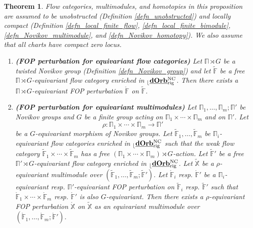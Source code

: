 \documentclass[reqno, 10pt]{amsart}
\numberwithin{equation}{section}
\numberwithin{equation}{section}
\newtheorem{thma}{Theorem}
\theoremstyle{definition}
\theoremstyle{remark}
\newcommand{\beqn}{\begin{equation*}}
\newcommand{\eeqn}{\end{equation*}}
\newcommand{\mb}{\mathbb}
\renewcommand{\outer}{{}_{\lfloor}}
\newcommand{\uds}[1]{\underline{\smash{#1}}}
\begin{document}
\begin{thma}\label{thma_FOP} 
Flow categories, multimodules, and homotopies in this proposition are assumed to be unobstructed (Definition \ref{defn_unobstructed}) and locally compact (Definition \ref{defn_local_finite_flow}, \ref{defn_local_finite_bimodule}, \ref{defn_Novikov_multimodule}, and \ref{defn_Novikov_homotopy}). We also assume that all charts have compact zero locus.
\begin{enumerate}

\item {\bf (FOP perturbation for equivariant flow categories)} Let $\mb\Pi \rtimes G$ be a twisted Novikov group (Definition \ref{defn_Novikov_group}) and let $\tilde {\mb F}$ be a free $\mb\Pi \rtimes G$-equivariant flow category enriched in $\outer \uds{\bf dOrb}_{\rm rig}^{\rm NC}$. Then there exists a $\mb\Pi\rtimes G$-equivariant FOP perturbation $\mathring {\mb F}$ on $\tilde {\mb F}$.


\item {\bf (FOP perturbation for equivariant multimodules)} Let $\mb\Pi_1, \ldots, \mb\Pi_m; \mb\Pi'$ be Novikov groups and $G$ be a finite group acting on $\mb\Pi_1\times \cdots \times \mb\Pi_m$ and on $\mb\Pi'$. Let
\beqn
\rho: \mb\Pi_1\times \cdots \times \mb\Pi_m \to \mb\Pi'
\eeqn
be a $G$-equivariant morphism of Novikov groups. Let $\tilde {\mb F}_1, \ldots, \tilde {\mb F}_m$ be $\mb\Pi_i$-equivariant flow categories enriched in $\outer \uds{\bf dOrb}_{\rm rig}^{\rm NC}$ such that the weak flow category $\tilde {\mb F}_1 \times \cdots \times \tilde {\mb F}_m$ has a free $(\mb\Pi_1 \times \cdots \times {\mb \Pi}_m) \rtimes G$-action. Let $\tilde{\mb F}'$ be a free $\mb\Pi'\rtimes G$-equivariant flow category enriched in $\outer \uds{\bf dOrb}_{\rm rig}^{\rm NC}$. Let $\tilde {\mb X}$ be a $\rho$-equivariant multimodule over $(\tilde{\mb F}_1, \ldots, \tilde{\mb F}_m; \tilde {\mb F}')$. Let $\mathring {\mb F}_i$ resp. $\mathring {\mb F}'$ be a $\mb\Pi_i$-equivariant resp. $\mb\Pi'$-equivariant FOP perturbation on $\tilde {\mb F}_i$ resp. $\tilde {\mb F}'$  such that $\mathring {\mb F}_1 \times \cdots \times \mathring {\mb F}_m$ resp. $\mathring {\mb F}'$ is also $G$-equivariant. Then there exists a $\rho$-equivariant FOP perturbation $\mathring {\mb X}$ on $\tilde {\mb X}$ as an equivariant multimodule over $(\mathring {\mb F}_1, \ldots, \mathring {\mb F}_m; \mathring {\mb F}')$. 



\end{enumerate}
\end{thma}
\end{document}
